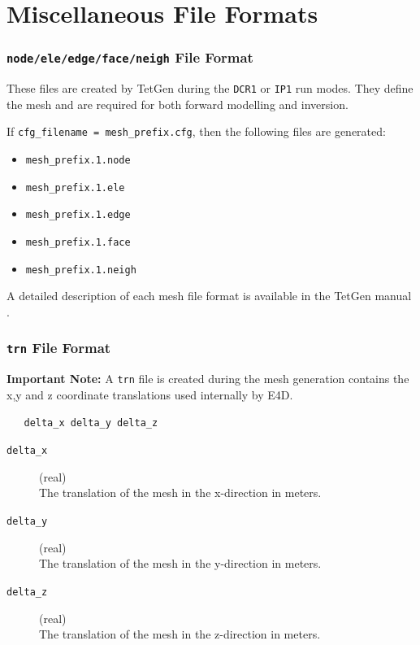 \documentclass[a4paper,12pt]{article}
\begin{document}
\newpage
\section{Miscellaneous File Formats}

\subsubsection{\texttt{node/ele/edge/face/neigh} File Format} \label{mesh_files}

These files are created by TetGen during the \texttt{DCR1} or \texttt{IP1} run modes. They define the mesh and are required for both forward modelling and inversion.

If \texttt{cfg\_filename = mesh\_prefix.cfg}, then the following files are generated:

\begin{itemize}
    \item \texttt{mesh\_prefix.1.node}
    \item \texttt{mesh\_prefix.1.ele}
    \item \texttt{mesh\_prefix.1.edge}
    \item \texttt{mesh\_prefix.1.face}
    \item \texttt{mesh\_prefix.1.neigh}
\end{itemize}

A detailed description of each mesh file format is available in the TetGen manual \cite{10.1145/2629697}.


\newpage
\subsubsection{\texttt{trn} File Format} \label{mesh_trn}

\begin{framed}
\noindent \textbf{Important Note:} A \texttt{trn} file is created during the mesh generation contains the x,y and z coordinate translations used internally by E4D.
\end{framed}

\begin{framed}
\begin{verbatim}
   delta_x delta_y delta_z
\end{verbatim}
\end{framed}

\begin{description}
    \item[\texttt{delta\_x}] (real)\hfill \\
    The translation of the mesh in the x-direction in meters.

    \item[\texttt{delta\_y}] (real)\hfill \\
    The translation of the mesh in the y-direction in meters.

    \item[\texttt{delta\_z}] (real)\hfill \\
    The translation of the mesh in the z-direction in meters.
\end{description}
\end{document}
